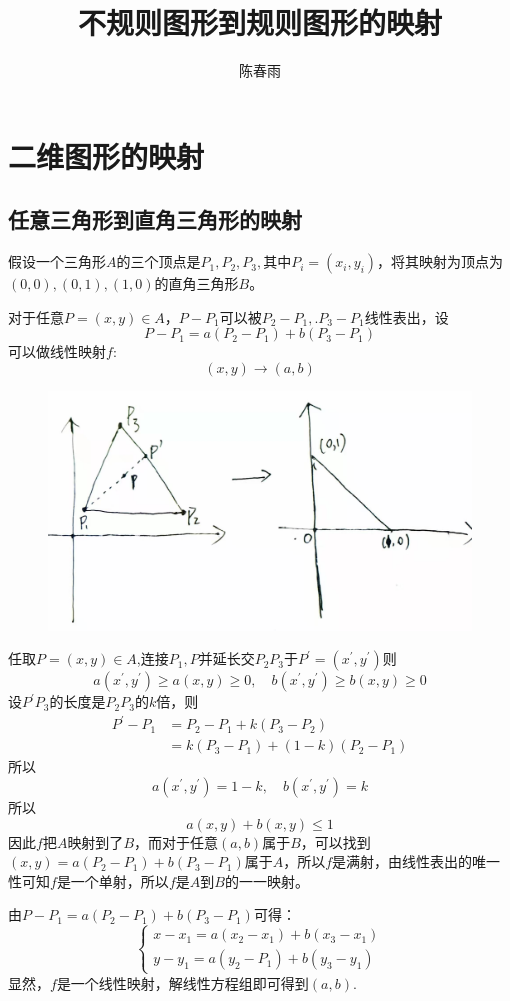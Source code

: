 \documentclass[12pt,a4paper]{article}
\title{不规则图形到规则图形的映射}
\author{陈春雨}
\date{\chntoday}
\begin{document}
\maketitle
\newpage
\section{二维图形的映射}
\subsection{ 任意三角形到直角三角形的映射}
假设一个三角形$A$的三个顶点是$P_1,P_2,P_3,$其中$P_i=(x_i,y_i)$，将其映射为顶点为$(0,0),(0,1),(1,0)$的直角三角形$B$。

对于任意$P=(x,y)\in A$，$P-P_1$可以被$P_2-P_1,.P_3-P_1$线性表出，设
$$
P-P_1=a(P_2-P_1)+b(P_3-P_1)
$$
可以做线性映射$f$:
$$
(x,y)\to (a,b)
$$
\begin{figure}[H]
\centering
\includegraphics[scale=0.15]{./figures/Figure_1.jpg}
\end{figure}
任取$ P=(x,y)\in A$,连接$P_1,P$并延长交$P_2P_3$于$P^{'}=(x^{'},y^{'})$则
$$
a(x^{'},y^{'})\ge a(x,y) \ge 0,\quad b(x^{'},y^{'})\ge b(x,y) \ge 0
$$
设$P^{'}P_3$的长度是$P_2P_3$的$k$倍，则
\begin{align*}
P^{'}-P_1&=P_2-P_1+k(P_3-P_2)\\
&=k(P_3-P_1)+(1-k)(P_2-P_1)
\end{align*}
所以
$$a(x^{'},y^{'})=1-k,\quad b(x^{'},y^{'})=k$$
所以$$a(x,y)+b(x,y)\le 1$$
因此$f$把$A$映射到了$B$，而对于任意$(a,b)$属于$B$，可以找到$(x,y)=a(P_2-P_1)+b(P_3-P_1)$属于$A$，所以$f$是满射，由线性表出的唯一性可知$f$是一个单射，所以$f$是$A$到$B$的一一映射。

由$P-P_1=a(P_2-P_1)+b(P_3-P_1)$可得：
$$
\begin{cases}
x-x_1=a(x_2-x_1)+b(x_3-x_1)\\
y-y_1=a(y_2-P_1)+b(y_3-y_1)
\end{cases}
$$
显然，$f$是一个线性映射，解线性方程组即可得到$(a,b)$.
\end{document}
